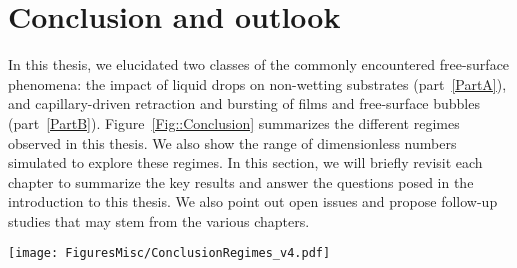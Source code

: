 \chapter*{Conclusion and outlook}\label{chap:Conclusions}

\renewcommand\thefigure{C\arabic{figure}} 
\setcounter{figure}{0}

In this thesis, we elucidated two classes of the commonly encountered free-surface phenomena: the impact of liquid drops on non-wetting substrates (part~\ref{PartA}), and capillary-driven retraction and bursting of films and free-surface bubbles (part~\ref{PartB}). Figure~\ref{Fig::Conclusion} summarizes the different regimes observed in this thesis. We also show the range of dimensionless numbers simulated to explore these regimes. In this section, we will briefly revisit each chapter to summarize the key results and answer the questions posed in the introduction to this thesis. We also point out open issues and propose follow-up studies that may stem from the various chapters.

\begin{sidewaysfigure}
	\centering
	\texttt{[image: FiguresMisc/ConclusionRegimes\_v4.pdf]}	
	\caption{Summary of the different regimes and the range of the dimensionless numbers simulated to explore these regimes. The different regime maps contain the Weber number $\Wen$ (equation~\eqref{Ch0::We}, chapters~\ref{chap:DropForces} and~\ref{chap:DropOnDrop}), the Bond number $\Bon$ (equation~\eqref{Ch0::Bo}, chapters~\ref{chap:DropForces} and~\ref{chap:DropViscousBouncing}), dimensionless film thickness $\Gamma$ (equation~\eqref{Ch0::Gamma}, chapter~\ref{chap:DropBouncingOnFilm}), the dimensionless offset $\chi$ (equation~\eqref{Ch0::X}) between the impacting and sessile drops (chapter~\ref{chap:DropOnDrop}), and the plasto-capillary number $\mathcal{J}$ (equation~\eqref{Ch0::J}, chapter~\ref{chap:BurstingBubbleVP}). A common theme among most of these regime maps is the use of Ohnesorge numbers $\Ohn$ (equation~\eqref{Ch0::Oh}) which can be further classified as: the drop Ohnesorge number (chapters~\ref{chap:DropViscousBouncing} and~\ref{chap:DropBouncingOnFilm}), the film Ohnesorge number $\Ohf$ (chapters~\ref{chap:DropBouncingOnFilm} and~\ref{chap:TaylorCulick}), and the surroundings Ohnesorge number $\Ohs$ (chapter~\ref{chap:TaylorCulick}). Please refer to the individual chapters for the details of each regime map.}
	\label{Fig::Conclusion}
\end{sidewaysfigure}

